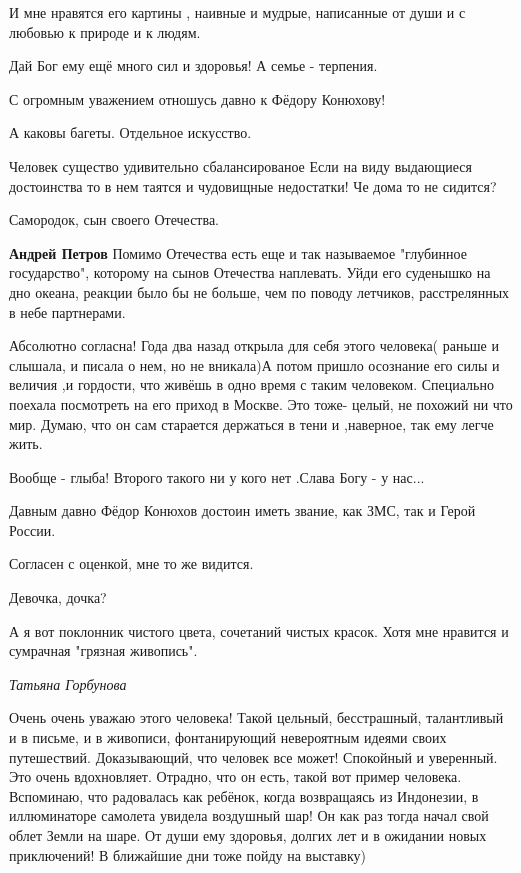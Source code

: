 \begin{itemize}
И мне нравятся его картины , наивные и мудрые, написанные от души и с любовью к
природе и к людям.

Дай Бог ему ещё много сил и здоровья! А семье - терпения.


С огромным уважением отношусь давно к Фёдору Конюхову!

А каковы багеты. Отдельное искусство.

Человек существо удивительно сбалансированое
Если на виду выдающиеся достоинства то в нем таятся и чудовищные недостатки!
Че дома то не сидится?

Самородок, сын своего Отечества.

\begin{itemize} %
\textbf{Андрей Петров} Помимо Отечества есть еще и так называемое "глубинное государство", которому на сынов Отечества наплевать. Уйди его суденышко на дно океана, реакции было бы не больше, чем по поводу летчиков, расстрелянных в небе партнерами.
\end{itemize} %


Абсолютно согласна! Года два назад открыла для себя этого человека( раньше и
слышала, и писала о нем, но не вникала)А потом пришло осознание его силы и
величия ,и гордости, что живёшь в одно время с таким человеком. Специально
поехала посмотреть на его приход в Москве. Это тоже- целый, не похожий ни что
мир. Думаю, что он сам старается держаться в тени и ,наверное, так ему легче жить.

Вообще - глыба! Второго такого ни у кого нет .Слава Богу - у нас...

Давным давно Фёдор Конюхов достоин иметь звание, как ЗМС, так и Герой России.

Согласен с оценкой, мне то же видится.

Девочка, дочка?

А я вот поклонник чистого цвета, сочетаний чистых красок. Хотя мне нравится и сумрачная "грязная живопись".

\emph{Татьяна Горбунова}

Очень очень уважаю этого человека! Такой цельный, бесстрашный, талантливый и в
письме, и в живописи, фонтанирующий невероятным идеями своих путешествий.
Доказывающий, что человек все может! Спокойный и уверенный. Это очень
вдохновляет. Отрадно, что он есть, такой вот пример человека. Вспоминаю, что
радовалась как ребёнок, когда возвращаясь из Индонезии, в иллюминаторе самолета
увидела воздушный шар! Он как раз тогда начал свой облет Земли на шаре. От души
ему здоровья, долгих лет и в ожидании новых приключений! В ближайшие дни тоже
пойду на выставку)



\end{itemize}
